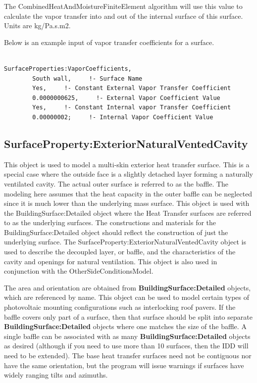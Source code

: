 The CombinedHeatAndMoistureFiniteElement algorithm will use this value to calculate the vapor transfer into and out of the internal surface of this surface. Units are kg/Pa.s.m2.

Below is an example input of vapor transfer coefficients for a surface.

\begin{lstlisting}

SurfaceProperties:VaporCoefficients,
        South wall,     !- Surface Name
        Yes,     !- Constant External Vapor Transfer Coefficient
        0.0000000625,     !- External Vapor Coefficient Value
        Yes,     !- Constant Internal vapor Transfer Coefficient
        0.00000002;     !- Internal Vapor Coefficient Value
\end{lstlisting}

\subsection{SurfaceProperty:ExteriorNaturalVentedCavity}\label{surfacepropertyexteriornaturalventedcavity}

This object is used to model a multi-skin exterior heat transfer surface. This is a special case where the outside face is a slightly detached layer forming a naturally ventilated cavity. The actual outer surface is referred to as the baffle. The modeling here assumes that the heat capacity in the outer baffle can be neglected since it is much lower than the underlying mass surface. This object is used with the BuildingSurface:Detailed object where the Heat Transfer surfaces are referred to as the underlying surfaces. The constructions and materials for the BuildingSurface:Detailed object should reflect the construction of just the underlying surface. The SurfaceProperty:ExteriorNaturalVentedCavity object is used to describe the decoupled layer, or baffle, and the characteristics of the cavity and openings for natural ventilation. This object is also used in conjunction with the OtherSideConditionsModel.

The area and orientation are obtained from \textbf{BuildingSurface:Detailed} objects, which are referenced by name. This object can be used to model certain types of photovoltaic mounting configurations such as interlocking roof pavers. If the baffle covers only part of a surface, then that surface should be split into separate \textbf{BuildingSurface:Detailed} objects where one matches the size of the baffle. A single baffle can be associated with as many \textbf{BuildingSurface:Detailed} objects as desired (although if you need to use more than 10 surfaces, then the IDD will need to be extended). The base heat transfer surfaces need not be contiguous nor have the same orientation, but the program will issue warnings if surfaces have widely ranging tilts and azimuths.

